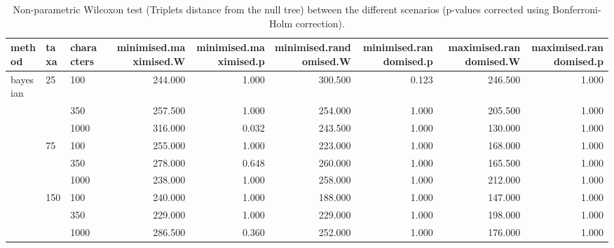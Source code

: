 \begin{table}[ht]
\centering
\begin{tabular}{lllrrrrrr}
  \hline
method & taxa & characters & minimised.maximised.W & minimised.maximised.p & minimised.randomised.W & minimised.randomised.p & maximised.randomised.W & maximised.randomised.p \\ 
  \hline
bayesian & 25 & 100 & 244.000 & 1.000 & 300.500 & 0.123 & 246.500 & 1.000 \\ 
   &  & 350 & 257.500 & 1.000 & 254.000 & 1.000 & 205.500 & 1.000 \\ 
   &  & 1000 & 316.000 & 0.032 & 243.500 & 1.000 & 130.000 & 1.000 \\ 
   & 75 & 100 & 255.000 & 1.000 & 223.000 & 1.000 & 168.000 & 1.000 \\ 
   &  & 350 & 278.000 & 0.648 & 260.000 & 1.000 & 165.500 & 1.000 \\ 
   &  & 1000 & 238.000 & 1.000 & 258.000 & 1.000 & 212.000 & 1.000 \\ 
   & 150 & 100 & 240.000 & 1.000 & 188.000 & 1.000 & 147.000 & 1.000 \\ 
   &  & 350 & 229.000 & 1.000 & 229.000 & 1.000 & 198.000 & 1.000 \\ 
   &  & 1000 & 286.500 & 0.360 & 252.000 & 1.000 & 176.000 & 1.000 \\ 
   \hline
\end{tabular}
\caption{Non-parametric Wilcoxon test (Triplets distance from the null tree) between the different scenarios (p-values corrected using Bonferroni-Holm correction).} 
\label{Full_Tab_Bayesian_WXTrnull}
\end{table}
